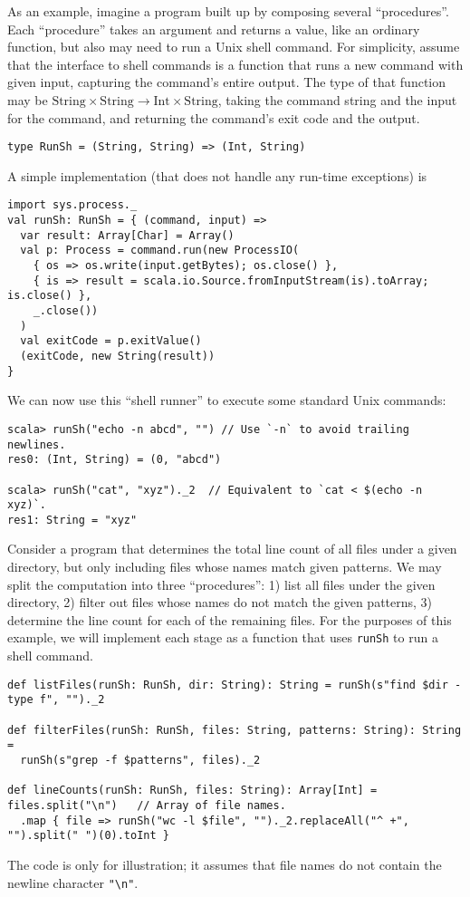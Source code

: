 As an example, imagine a program built up by composing several \textsf{``}procedures\textsf{''}.
Each \textsf{``}procedure\textsf{''} takes an argument and returns a value, like an
ordinary function, but also may need to run a Unix shell command.
For simplicity, assume that the interface to shell commands is a function
that runs a new command with given input, capturing the command\textsf{'}s
entire output. The type of that function may be $\text{String}\times\text{String}\rightarrow\text{Int}\times\text{String}$,
taking the command string and the input for the command, and returning
the command\textsf{'}s exit code and the output.
\begin{lstlisting}
type RunSh = (String, String) => (Int, String)
\end{lstlisting}
A simple implementation (that does not handle any run-time exceptions)
is
\begin{lstlisting}
import sys.process._
val runSh: RunSh = { (command, input) =>
  var result: Array[Char] = Array()
  val p: Process = command.run(new ProcessIO(
    { os => os.write(input.getBytes); os.close() },
    { is => result = scala.io.Source.fromInputStream(is).toArray; is.close() },
    _.close())
  )
  val exitCode = p.exitValue()
  (exitCode, new String(result))
}
\end{lstlisting}
We can now use this \textsf{``}shell runner\textsf{''} to execute some standard Unix
commands:
\begin{lstlisting}
scala> runSh("echo -n abcd", "") // Use `-n` to avoid trailing newlines.
res0: (Int, String) = (0, "abcd")

scala> runSh("cat", "xyz")._2  // Equivalent to `cat < $(echo -n xyz)`.
res1: String = "xyz"
\end{lstlisting}

Consider a program that determines the total line count of all files
under a given directory, but only including files whose names match
given patterns. We may split the computation into three \textsf{``}procedures\textsf{''}:
1) list all files under the given directory, 2) filter out files whose
names do not match the given patterns, 3) determine the line count
for each of the remaining files. For the purposes of this example,
we will implement each stage as a function that uses \lstinline!runSh!
to run a shell command.
\begin{lstlisting}
def listFiles(runSh: RunSh, dir: String): String = runSh(s"find $dir -type f", "")._2

def filterFiles(runSh: RunSh, files: String, patterns: String): String =
  runSh(s"grep -f $patterns", files)._2

def lineCounts(runSh: RunSh, files: String): Array[Int] = files.split("\n")   // Array of file names.
  .map { file => runSh("wc -l $file", "")._2.replaceAll("^ +", "").split(" ")(0).toInt }
\end{lstlisting}
The code is only for illustration; it assumes that file names do not
contain the newline character \lstinline!"\n"!.

